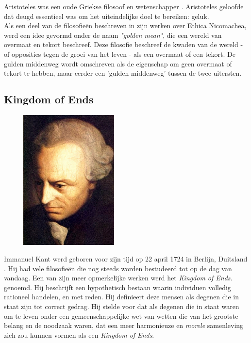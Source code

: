 \documentclass[11pt]{article}
\begin{document}
Aristoteles was een oude Griekse filosoof en wetenschapper \cite{aristotle}. 
Aristoteles geloofde dat deugd essentieel was om het uiteindelijke doel te bereiken: geluk.\\ 
\noindent Als een deel van de filosofie\"en beschreven in zijn werken over Ethica Nicomachea, werd een idee gevormd onder de naam \textit{"golden mean"}, die een wereld van overmaat en tekort beschreef. Deze filosofie beschreef de kwaden van de wereld - of opposities tegen de groei van het leven - als een overmaat of een tekort. De gulden middenweg wordt omschreven als de eigenschap om geen overmaat of tekort te hebben, maar eerder een 'gulden middenweg' tussen de twee uitersten.

\pagebreak
\subsection{Kingdom of Ends}

\begin{figure}
    \centering
    \includegraphics[width=0.44\textwidth]{kant.jpg}
\end{figure}

Immanuel Kant werd geboren voor zijn tijd op 22 april 1724 in Berlijn, Duitsland \cite{kant}. Hij had vele filosofie\"en die nog steeds worden bestudeerd tot op de dag van vandaag. Een van zijn meer opmerkelijke werken werd het \textit{Kingdom of Ends}. genoemd. Hij beschrijft een hypothetisch bestaan ​​waarin individuen volledig rationeel handelen, en met reden. Hij definieert deze mensen als degenen die in staat zijn tot correct gedrag. Hij stelde voor dat als degenen die in staat waren om te leven onder een gemeenschappelijke wet van wetten die van het grootste belang en de noodzaak waren, dat een meer harmonieuze en \textit{morele} samenleving zich zou kunnen vormen als een \textit{Kingdom of Ends}.\\
\end{document}
